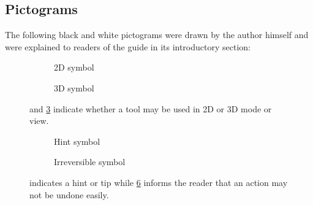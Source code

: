 \subsection{Pictograms}\label{s:mm-pictograms}
The following black and white pictograms were drawn by the author himself and were explained to readers of the guide in its introductory section:
\newline
\begin{figure}[h!]
	\begin{centering}
		\begin{subfigure}{0.5\textwidth}
			
			\caption{2D symbol}\label{fig:2d_icon}
		\end{subfigure}
		\begin{subfigure}{0.5\textwidth}
			
			\caption{3D symbol}\label{fig:3d_icon}
		\end{subfigure}
	\end{centering}
	\caption{ and \cref{fig:3d_icon} indicate whether a tool may be used in 2D or 3D mode or view.}
\end{figure}

\begin{figure}[h!]
	\begin{centering}
		\begin{subfigure}{0.5\textwidth}
			
			\caption{Hint symbol}\label{fig:hint_icon}
		\end{subfigure}
		\begin{subfigure}{0.5\textwidth}
			
			\caption{Irreversible symbol}\label{fig:noundo_icon}
		\end{subfigure}
	\end{centering}
	\caption{ indicates a hint or tip while \cref{fig:noundo_icon} informs the reader that an action may not be undone easily.}
\end{figure}

